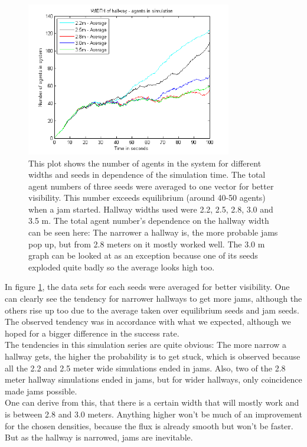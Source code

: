 \begin{figure}[h!]
	\centering
		\includegraphics[width=0.80\textwidth]{pictures/AAveragesInOne.png}
	\caption{This plot shows the number of agents in the system for different widths and seeds in dependence of the simulation time. The total agent numbers of three seeds were averaged to one vector for better visibility. This number exceeds equilibrium (around 40-50 agents) when a jam started.  Hallway widths used were 2.2, 2.5, 2.8, 3.0 and 3.5 m. The total agent number's dependence on the hallway width can be seen here: The narrower a hallway is, the more probable jams pop up, but from 2.8 meters on it mostly worked well. The 3.0 m graph can be looked at as an exception because one of its seeds exploded quite badly so the average looks high too.}
	\label{fig:AveragesInOne}
\end{figure}

\noi In figure \ref{fig:AveragesInOne}, the data sets for each seeds were averaged for better visibility. One can clearly see the tendency for narrower hallways to get more jams, although the others rise up too due to the average taken over equilibrium seeds and jam seeds.\\

\noi The observed tendency was in accordance with what we expected, although we hoped for a bigger difference in the success rate.\\

The tendencies in this simulation series are quite obvious: The more narrow a hallway gets, the higher the probability is to get stuck, which is observed because all the 2.2 and 2.5 meter wide simulations ended in jams. Also, two of the 2.8 meter hallway simulations ended in jams, but for wider hallways, only coincidence made jams possible.\\
One can derive from this, that there is a certain width that will mostly work and is between 2.8 and 3.0 meters. Anything higher won't be much of an improvement for the chosen densities, because the flux is already smooth but won't be faster. But as the hallway is narrowed, jams are inevitable.\\
